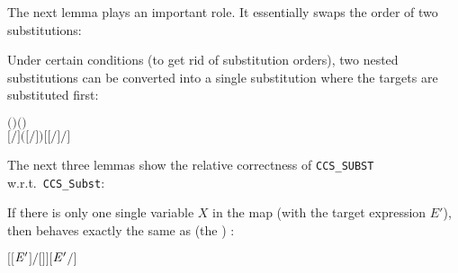 The next lemma plays an important role. It essentially swaps the order of two substitutions:
\begin{lemma}
Under certain conditions (to get rid of substitution orders), two nested substitutions can be
converted into a single substitution where the targets are substituted first:
\begin{alltt}
\HOLTokenTurnstile{}   \HOLSymConst{\HOLTokenConj{}}   \HOLSymConst{\ensuremath{=}}   \HOLSymConst{\HOLTokenConj{}}   \HOLSymConst{\ensuremath{=}}   \HOLSymConst{\HOLTokenConj{}}
    \ensuremath{(} \ensuremath{)} \ensuremath{(} \ensuremath{)} \HOLSymConst{\HOLTokenImp{}}
   \ensuremath{[}\ensuremath{/}\ensuremath{]} \ensuremath{(}\ensuremath{[}\ensuremath{/}\ensuremath{]} \ensuremath{)} \HOLSymConst{\ensuremath{=}} \ensuremath{[} \ensuremath{[}\ensuremath{/}\ensuremath{]} \ensuremath{/}\ensuremath{]} 
\end{alltt}
\end{lemma}

The next three lemmas show the relative correctness of \texttt{CCS\_SUBST}
w.r.t.~\texttt{CCS\_Subst}:
\begin{lemma}
  If there is only one single variable $X$ in the map (with the target
  expression $E'$), then  behaves exactly the
  same as (the \univariate) :
\begin{alltt}
\HOLTokenTurnstile{} \ensuremath{[}\ensuremath{[}\ensuremath{\HOLFreeVar{E}\sp{\prime}}\ensuremath{]}\ensuremath{/}\ensuremath{[}\ensuremath{]}\ensuremath{]}  \HOLSymConst{\ensuremath{=}} \ensuremath{[}\ensuremath{\HOLFreeVar{E}\sp{\prime}}\ensuremath{/}\ensuremath{]} 
\end{alltt}
\end{lemma}

